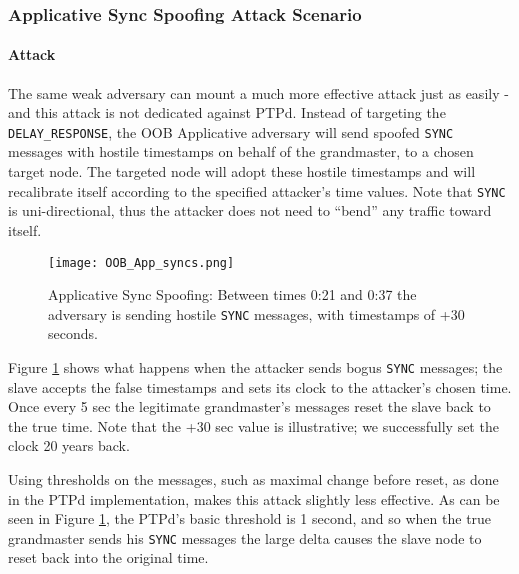\documentclass[11pt]{article}
\begin{document}
\subsubsection{Applicative Sync Spoofing Attack Scenario}\label{time:scenrio2}

\paragraph{Attack}

The same weak adversary can mount a much more effective attack just as easily - and this attack is not dedicated against PTPd. Instead of targeting the \texttt{DELAY_RESPONSE}, the OOB Applicative adversary will send spoofed \texttt{SYNC} messages with hostile timestamps on behalf of the grandmaster, to a chosen target node. The targeted node will adopt these hostile timestamps and will recalibrate itself according to the specified attacker's time values. Note that \texttt{SYNC} is uni-directional, thus the attacker does not need to ``bend'' any traffic toward itself.



\begin{figure}[t]

\centerline{\texttt{[image: OOB\_App\_syncs.png]}}

\caption{Applicative Sync Spoofing: Between times 0:21 and 0:37 the adversary is sending hostile \texttt{SYNC} messages, with timestamps of +30 seconds.}

\label{App Syncs}

\end{figure}



Figure \ref{App Syncs} shows what happens when the attacker sends bogus \texttt{SYNC} messages; the slave accepts the false timestamps and sets its clock to the attacker's chosen time. Once every 5 sec the legitimate grandmaster's messages reset the slave back to the true time. Note that the +30 sec value is illustrative; we successfully set the clock 20 years back.

Using thresholds on the messages, such as maximal change before reset, as done in the PTPd implementation, makes this attack slightly less effective. As can be seen in Figure \ref{App Syncs}, the PTPd's basic threshold is 1 second, and so when the true grandmaster sends his \texttt{SYNC} messages the large delta causes the slave node to reset back into the original time.
\end{document}
